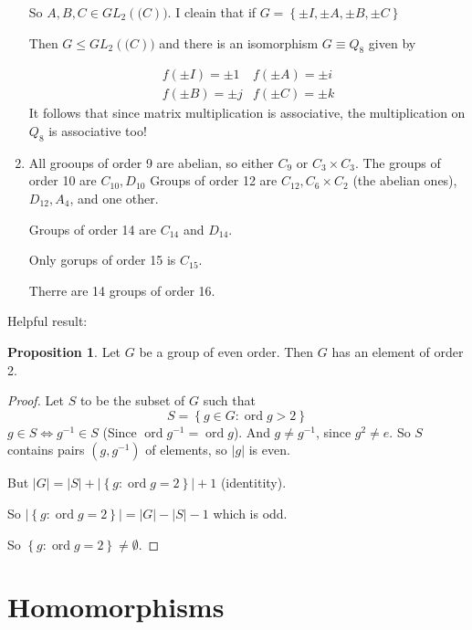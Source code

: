 \documentclass{article}
\theoremstyle{definition}
\newtheorem{proposition}{Proposition}
\DeclareMathOperator{\ord}{\text{ord}}
\begin{document}
\begin{enumerate}
  So $A,B,C \in GL_2(\mathbb(C))$. I cleain that if $G = \left\{ \pm I, \pm A, \pm B, \pm C \right\}$

  Then $G \leq GL_2(\mathbb(C))$ and there is an isomorphism $G \equiv Q_8$ given by 

  \begin{equation*}
    \begin{matrix}
      f(\pm I ) = \pm 1 & f(\pm A) = \pm i \\
      f(\pm B ) = \pm j & f(\pm C ) = \pm k
    \end{matrix}
    \label{}
  \end{equation*}
  It follows that since matrix multiplication is associative, the multiplication on $Q_8$ is associative too!

\item All grooups of order 9 are abelian, so either $C_9$ or $C_3 \times C_3$.
  The groups of order 10 are $C_{10},D_{10}$ Groups of order 12 are $C_{12}, C_{6} \times C_2$ (the abelian ones), $D_{12},A_{4}$, and one other. 

  Groups of order 14 are $C_{14}$ and $D_{14}$. 

  Only gorups of order 15 is $C_{15}$.

  Therre are 14 groups of order 16.
\end{enumerate}

Helpful result:
\begin{proposition}
  Let $G$ be a group of even order. Then $G$ has an element of order 2.
\end{proposition}

\begin{proof}
  Let $S$ to be the subset of $G$ such that 
  \begin{equation*}
    S = \left\{ g \in G : \ord g > 2 \right\}
    \label{}
  \end{equation*}
  $g \in S \iff g^{-1} \in S$ (Since $\ord g^{-1} = \ord g$). And $g \neq g^{-1}$, since $g^2 \neq e$. So $S$ contains pairs $(g,g^{-1})$ of elements, so $|g|$ is even. 

  But $|G|=|S| + |\left\{ g : \ord g=2 \right\}| + 1$ (identitity). 

  So $|\left\{ g : \ord g = 2 \right\}|=|G|-|S|-1$ which is odd. 

  So $\left\{ g : \ord g = 2 \right\} \neq \emptyset.$

\end{proof}


\section{Homomorphisms}
\end{document}
